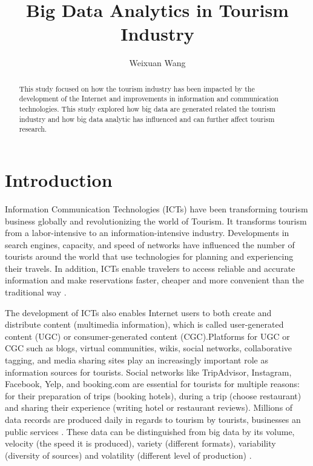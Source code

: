 \documentclass[sigconf]{acmart}
\begin{document}
\title{Big Data Analytics in Tourism Industry}


\author{Weixuan Wang}


\renewcommand{\shortauthors}{W. Wang}


\begin{abstract}
This study focused on how the tourism industry has been impacted by the
development of the Internet and improvements in information and communication
technologies. This study explored how big data are generated related the tourism
industry and how big data analytic has influenced and can further affect tourism
research.
\end{abstract}



\maketitle

\section{Introduction}

Information Communication Technologies (ICTs) have been transforming tourism business
globally and revolutionizing the world of Tourism. It transforms tourism from a
labor-intensive to an information-intensive industry\cite{Williams201787}.
Developments in search engines, capacity, and speed of networks have influenced the
number of tourists around the world that use technologies for planning and
experiencing their travels. In addition, ICTs enable travelers to access reliable and
accurate information and make reservations faster, cheaper and more convenient than
the traditional way \cite{chung2009}.


The development of ICTs also enables Internet users to both create and distribute
content (multimedia information), which is called user-generated content (UGC) or
consumer-generated content (CGC)\cite{chung2009}.Platforms for UGC or CGC such as
blogs, virtual communities, wikis, social networks, collaborative tagging, and media
sharing sites play an increasingly important role as information sources for tourists.
Social networks like TripAdvisor, Instagram, Facebook, Yelp, and booking.com are
essential for tourists for multiple reasons: for their preparation of trips (booking
hotels), during a trip (choose restaurant) and sharing their experience (writing hotel
or restaurant reviews). Millions of data records are produced daily in regards to
tourism by tourists, businesses an public services \cite{Shafiee16}. These data can be
distinguished from big data by its volume, velocity (the speed it is produced),
variety (different formats), variability (diversity of sources) and volatility
(different level of production) \cite{MIAH2017}. 
\end{document}
